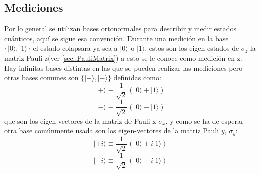 \documentclass[a4paper]{article}
\begin{document}
\subsection{Mediciones}
Por lo general se utilizan bases ortonormales para describir y medir estados cuánticos, aquí se sigue esa convención. Durante una medición en la base $\{|0\rangle, |1\rangle\}$ el estado colapsara ya sea a $|0\rangle$ o $|1\rangle$, estos son los eigen-estados de $\sigma_z$ la matriz Pauli-z(ver \ref{sec::PauliMatrix}) a esto se le conoce como medición en z.\\
Hay infinitas bases distintas en las que se pueden realizar las mediciones pero otras bases comunes son $\{|+\rangle, |-\rangle \}$ definidas como:
\begin{equation}
|+\rangle\equiv\frac{1}{\sqrt{2}}(|0\rangle+|1\rangle)
\end{equation}
\begin{equation}
|-\rangle\equiv\frac{1}{\sqrt{2}}(|0\rangle-|1\rangle)
\end{equation}
que son los eigen-vectores de la matriz de Pauli x $\sigma_x$, y como se ha de esperar otra base comúnmente usada son los eigen-vectores de la matriz Pauli $y$, $\sigma_y$:
\begin{equation}
|+i\rangle\equiv\frac{1}{\sqrt{2}}(|0\rangle+i|1\rangle)
\end{equation}
\begin{equation}
|-i\rangle\equiv\frac{1}{\sqrt{2}}(|0\rangle-i|1\rangle)
\end{equation}
\end{document}
